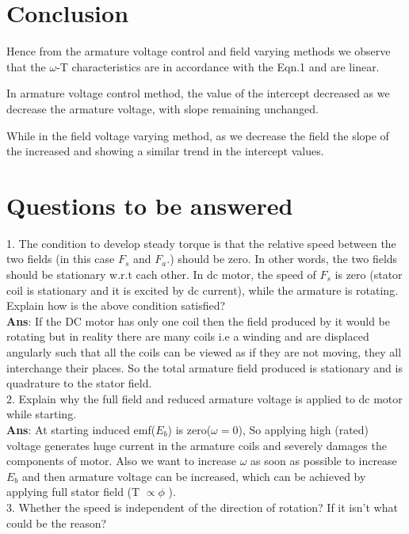 \documentclass[12pt]{article}
\begin{document}
    \section{Conclusion}
    Hence from the armature voltage control and field varying methods we observe that the $\omega$-T characteristics are in accordance with the Eqn.1 and are linear.
    
    In armature voltage control method, the value of the intercept decreased as we decrease the armature voltage, with slope remaining unchanged.
    
    While in the field voltage varying method, as we decrease the field the slope of the increased and showing a similar trend in the intercept values.
    \section{Questions to be answered}
    1. The condition to develop steady torque is that the relative speed between the two fields (in this case $F_s$ and $F_a$.) should be zero. In other words, the two fields should be stationary w.r.t cach other. In dc motor, the speed of $F_s$ is zero (stator coil is stationary and it is excited by dc current), while the armature is rotating. Explain how is the above condition satisfied?\vspace{0.1cm} \\
    \textbf{Ans}: If the DC motor has only one coil then the field produced by it would be rotating but in reality there are many coils i.e a winding and are displaced angularly such that all the coils can be viewed as if they are not moving, they all interchange their places. So the total armature field produced is stationary and is quadrature to the stator field.     
    \vspace{0.2cm}\\
    2. Explain why the full field and reduced armature voltage is applied to dc motor while starting.\vspace{0.1cm} \\
    \textbf{Ans}: At starting induced emf($E_b$) is zero($\omega = 0$), So applying high (rated) voltage generates huge current in the armature coils and severely damages the components of motor. Also we want to increase $\omega$ as soon as possible to increase $E_b$ and then armature voltage can be increased, which can be achieved by applying full stator field (T $\propto \phi$ ).
    \vspace{0.2cm}\\
    3. Whether the speed is independent of the direction of rotation? If it isn't what could be the reason?\vspace{0.1cm} \\
\end{document}
